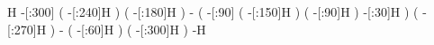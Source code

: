            H%
    -[:300]%
              (
        -[:240]H%
              )
              (
        -[:180]H%
              )
          -%
              (
         -[:90]%
                  (
            -[:150]H%
                  )
                  (
             -[:90]H%
                  )
         -[:30]H%
              )
              (
        -[:270]H%
              )
          -%
              (
         -[:60]H%
              )
              (
        -[:300]H%
              )
          -H%
